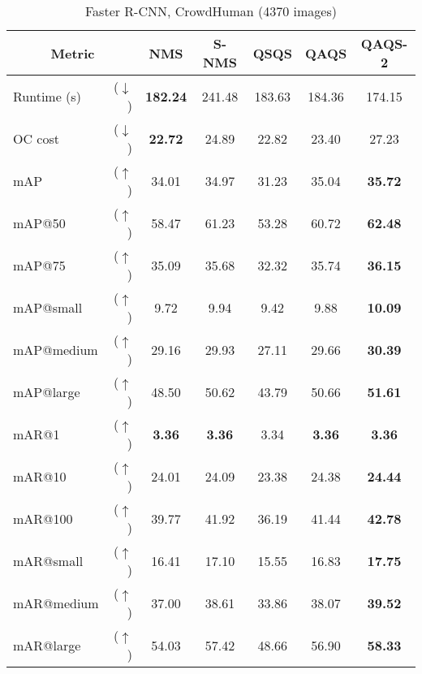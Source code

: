 \setlength\tabcolsep{0.75mm} 
\begin{table}
    \centering
    \caption{Faster R-CNN, CrowdHuman (4370 images)}
    \begin{tabular}{l r ccccc}
    \toprule
    \multicolumn{2}{c}{Metric} & NMS & S-NMS & QSQS & QAQS & QAQS-2 \\
    \midrule 
    Runtime (s)&($\downarrow$)& \textbf{182.24} & 241.48 & 183.63 & 184.36 & 174.15 \\ 
    \midrule        
    OC cost    &($\downarrow$)&  \textbf{22.72} &  24.89 &  22.82 &  23.40 &  27.23 \\
    \midrule        
    mAP        & ($\uparrow$) &  34.01 &  34.97 &  31.23 &  35.04 &  \textbf{35.72} \\
    mAP@50     & ($\uparrow$) &  58.47 &  61.23 &  53.28 &  60.72 &  \textbf{62.48} \\
    mAP@75     & ($\uparrow$) &  35.09 &  35.68 &  32.32 &  35.74 &  \textbf{36.15} \\
    mAP@small  & ($\uparrow$) &   9.72 &   9.94 &   9.42 &   9.88 &  \textbf{10.09} \\
    mAP@medium & ($\uparrow$) &  29.16 &  29.93 &  27.11 &  29.66 &  \textbf{30.39} \\
    mAP@large  & ($\uparrow$) &  48.50 &  50.62 &  43.79 &  50.66 &  \textbf{51.61} \\
    \midrule 
    mAR@1      & ($\uparrow$) &   \textbf{3.36} &   \textbf{3.36} &   3.34 &   \textbf{3.36} &  \textbf{ 3.36} \\
    mAR@10     & ($\uparrow$) &  24.01 &  24.09 &  23.38 &  24.38 &  \textbf{24.44} \\
    mAR@100    & ($\uparrow$) &  39.77 &  41.92 &  36.19 &  41.44 &  \textbf{42.78} \\
    mAR@small  & ($\uparrow$) &  16.41 &  17.10 &  15.55 &  16.83 &  \textbf{17.75} \\
    mAR@medium & ($\uparrow$) &  37.00 &  38.61 &  33.86 &  38.07 &  \textbf{39.52} \\
    mAR@large  & ($\uparrow$) &  54.03 &  57.42 &  48.66 &  56.90 &  \textbf{58.33} \\
    \bottomrule
    \end{tabular}
\end{table}

























